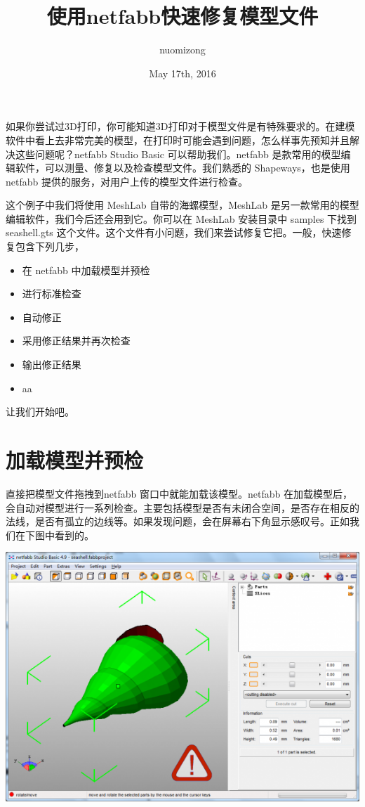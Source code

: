 \documentclass[10pt,a4paper]{article}
\begin{document}
\begin{CJK*}{UTF8}{song} %

\author{nuomizong}
\title{使用netfabb快速修复模型文件}
\date{May 17th, 2016}
\maketitle

\tableofcontents

\newpage
如果你尝试过3D打印，你可能知道3D打印对于模型文件是有特殊要求的。在建模软件中看上去非常完美的模型，在打印时可能会遇到问题，怎么样事先预知并且解决这些问题呢？netfabb Studio Basic 可以帮助我们。netfabb 是款常用的模型编辑软件，可以测量、修复以及检查模型文件。我们熟悉的 Shapeways，也是使用 netfabb 提供的服务，对用户上传的模型文件进行检查。

这个例子中我们将使用 MeshLab 自带的海螺模型，MeshLab 是另一款常用的模型编辑软件，我们今后还会用到它。你可以在 MeshLab 安装目录中 samples 下找到 seashell.gts 这个文件。这个文件有小问题，我们来尝试修复它把。一般，快速修复包含下列几步，

\begin{itemize}
\item 在 netfabb 中加载模型并预检
\item 进行标准检查
\item 自动修正
\item 采用修正结果并再次检查
\item 输出修正结果
\item aa
\end{itemize}

让我们开始吧。

\section{加载模型并预检}
直接把模型文件拖拽到netfabb 窗口中就能加载该模型。netfabb 在加载模型后，会自动对模型进行一系列检查。主要包括模型是否有未闭合空间，是否存在相反的法线，是否有孤立的边线等。如果发现问题，会在屏幕右下角显示感叹号。正如我们在下图中看到的。

\includegraphics[width=0.7\linewidth]{importModels}


\end{CJK*}
\end{document}
